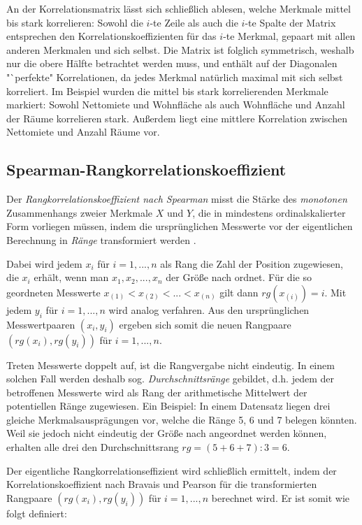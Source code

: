 \noindent An der Korrelationsmatrix lässt sich schließlich ablesen, welche Merkmale mittel bis stark korrelieren: Sowohl die $i$-te Zeile als auch die $i$-te Spalte der Matrix  entsprechen den Korrelationskoeffizienten für das $i$-te Merkmal, gepaart mit allen anderen Merkmalen und sich selbst. Die Matrix ist folglich symmetrisch, weshalb nur die obere Hälfte betrachtet werden muss, und enthält auf der Diagonalen "`perfekte" Korrelationen, da jedes Merkmal natürlich maximal mit sich selbst korreliert. Im Beispiel wurden die mittel bis stark korrelierenden Merkmale markiert: Sowohl Nettomiete und Wohnfläche als auch Wohnfläche und Anzahl der Räume korrelieren stark. Außerdem liegt eine mittlere Korrelation zwischen Nettomiete und Anzahl Räume vor.

\subsection{Spearman-Rangkorrelationskoeffizient}

Der {\it Rangkorrelationskoeffizient nach Spearman} misst die Stärke des {\it monotonen} Zusammenhangs zweier Merkmale $X$ und $Y$, die in mindestens ordinalskalierter Form vorliegen müssen, indem die ursprünglichen Messwerte vor der eigentlichen Berechnung in {\it Ränge} transformiert werden \cite{Fahrmeir2010}.

Dabei wird jedem $x_i$ für $i=1,...,n$ als Rang die Zahl der Position zugewiesen, die $x_i$ erhält, wenn man $x_1, x_2, ..., x_n$ der Größe nach ordnet. Für die so geordneten Messwerte $x_{(1)}<x_{(2)}<...<x_{(n)}$ gilt dann $rg(x_{(i)})=i$. Mit jedem $y_i$ für $i=1,...,n$ wird analog verfahren. Aus den ursprünglichen Messwertpaaren $(x_i, y_i)$ ergeben sich somit die neuen Rangpaare $(rg(x_i), rg(y_i))$ für $i=1,...,n$.

Treten Messwerte doppelt auf, ist die Rangvergabe nicht eindeutig. In einem solchen Fall werden deshalb sog. {\it Durchschnittsränge} gebildet, d.h. jedem der betroffenen Messwerte wird als Rang der arithmetische Mittelwert der potentiellen Ränge zugewiesen. Ein Beispiel: In einem Datensatz liegen drei gleiche Merkmalsausprägungen vor, welche die Ränge 5, 6 und 7 belegen könnten. Weil sie jedoch nicht eindeutig der Größe nach angeordnet werden können, erhalten alle drei den Durchschnittsrang $rg=(5+6+7):3=6$.

Der eigentliche Rangkorrelationseffizient wird schließlich ermittelt, indem der Korrelationskoeffizient nach Bravais und Pearson für die transformierten Rangpaare $(rg(x_i), rg(y_i))$ für $i=1,...,n$ berechnet wird. Er ist somit wie folgt definiert:

